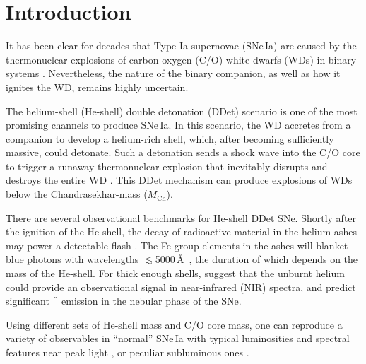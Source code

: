 \documentclass[twocolumn]{aastex631}
\newcommand{\Mch}{$M_\mathrm{Ch}$}
\begin{document}


\section{Introduction} \label{sec:intro}
It has been clear for decades that Type Ia supernovae (SNe\,Ia) are caused by the thermonuclear explosions of carbon-oxygen (C/O) white dwarfs (WDs) in binary systems \citep[see][for a review]{Maoz_2014}. Nevertheless, the nature of the binary companion, as well as how it ignites the WD, remains highly uncertain. 

The helium-shell (He-shell) double detonation (DDet) scenario is one of the most promising channels to produce SNe\,Ia. In this scenario, the WD accretes from a companion to develop a helium-rich shell, which, after becoming sufficiently massive, could detonate. Such a detonation sends a shock wave into the C/O core to trigger a runaway thermonuclear explosion that inevitably disrupts and destroys the entire WD \citep{Nomoto_1982a, Nomoto_1982b, Woosley_1986, Livne_1990, Woosley_1994, Livne_1995}. This DDet mechanism can produce explosions of WDs below the Chandrasekhar-mass (\Mch).

There are several observational benchmarks for He-shell DDet SNe. Shortly after the ignition of the He-shell, the decay of radioactive material in the helium ashes may power a detectable flash \citep{Woosley_1994,Fink_DD_2010,Kromer_DD_2010}. The Fe-group elements in the ashes will blanket blue photons with wavelengths $\lesssim$5000\,\AA\ \citep{Kromer_DD_2010}, the duration of which depends on the mass of the He-shell. For thick enough shells, \citet{Boyle2017_Helium} suggest that the unburnt helium could provide an observational signal in near-infrared (NIR) spectra, and \citet{polin_nebular_2021} predict significant [] emission in the nebular phase of the SNe.

Using different sets of He-shell mass and C/O core mass, one can reproduce a variety of observables in ``normal'' SNe\,Ia with typical luminosities and spectral features near peak light \citep[e.g.,][]{polin_observational_2019,Shen_2D_2021}, or peculiar subluminous ones \citep[e.g.,][]{polin_observational_2019}. 
\end{document}
